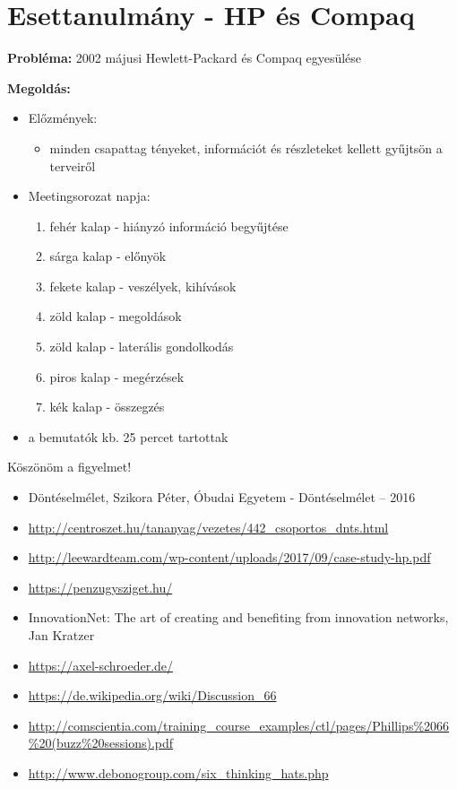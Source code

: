 \documentclass{beamer}
\begin{document}
\section{Esettanulmány - HP és Compaq}
\begin{frame}
\textbf{Probléma:} 2002 májusi Hewlett-Packard és Compaq egyesülése

\textbf{Megoldás:}
\begin{itemize}
    \item Előzmények:
    \begin{itemize}
        \item minden csapattag tényeket, információt és részleteket kellett gyűjtsön a terveiről
    \end{itemize}
    \item Meetingsorozat napja:
    \begin{enumerate}
        \item fehér kalap - hiányzó információ begyűjtése
        \item sárga kalap - előnyök
        \item fekete kalap - veszélyek, kihívások
        \item zöld kalap - megoldások
        \item zöld kalap - laterális gondolkodás
        \item piros kalap - megérzések
        \item kék kalap - összegzés
    \end{enumerate}
    \item a bemutatók kb. 25 percet tartottak
\end{itemize}

\end{frame}


\begin{frame}
\centering
{\Huge Köszönöm a figyelmet!}
\end{frame}

\begin{footnotesize}
    \begin{itemize}
        \item Döntéselmélet, Szikora Péter, Óbudai Egyetem - Döntéselmélet – 2016
        \item \url{http://centroszet.hu/tananyag/vezetes/442_csoportos_dnts.html}
        \item \url{http://leewardteam.com/wp-content/uploads/2017/09/case-study-hp.pdf}
        \item \url{https://penzugysziget.hu/}
        \item InnovationNet: The art of creating and benefiting from innovation networks, Jan Kratzer
        \item \url{https://axel-schroeder.de/}
        \item \url{https://de.wikipedia.org/wiki/Discussion_66}
        \item \url{http://comscientia.com/training_course_examples/ctl/pages/Phillips\%2066\%20(buzz\%20sessions).pdf}
        \item \url{http://www.debonogroup.com/six_thinking_hats.php}
    \end{itemize}
\end{footnotesize}
\end{document}
